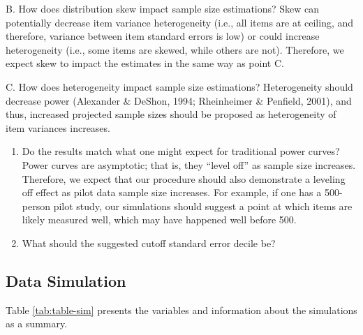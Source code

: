 \documentclass[
  man]{apa7}
\begin{document}
B. How does distribution skew impact sample size estimations? Skew can potentially decrease item variance heterogeneity (i.e., all items are at ceiling, and therefore, variance between item standard errors is low) or could increase heterogeneity (i.e., some items are skewed, while others are not). Therefore, we expect skew to impact the estimates in the same way as point C.

C. How does heterogeneity impact sample size estimations? Heterogeneity should decrease power (Alexander \& DeShon, 1994; Rheinheimer \& Penfield, 2001), and thus, increased projected sample sizes should be proposed as heterogeneity of item variances increases.

\begin{enumerate}
\def\labelenumi{\arabic{enumi})}
\setcounter{enumi}{1}
\item
  Do the results match what one might expect for traditional power curves? Power curves are asymptotic; that is, they ``level off'' as sample size increases. Therefore, we expect that our procedure should also demonstrate a leveling off effect as pilot data sample size increases. For example, if one has a 500-person pilot study, our simulations should suggest a point at which items are likely measured well, which may have happened well before 500.
\item
  What should the suggested cutoff standard error decile be?
\end{enumerate}

\hypertarget{data-simulation}{%
\subsection{Data Simulation}\label{data-simulation}}

Table \ref{tab:table-sim} presents the variables and information about the simulations as a summary.
\end{document}
